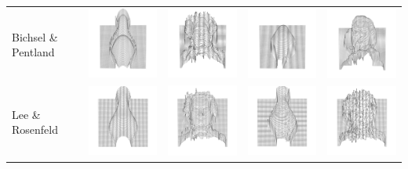 \documentclass{beamer}
\begin{document}
\begin{frame}
\begin{tabular}{lcccc}
		Bichsel \& Pentland &
		\includegraphics[width=0.15\linewidth]{includes/vergleich/bichsel_pentland/bichsel_pentland_vase_001} & \includegraphics[width=0.15\linewidth]{includes/vergleich/bichsel_pentland/bichsel_pentland_mozart_001} &
		\includegraphics[width=0.15\linewidth]{includes/vergleich/bichsel_pentland/bichsel_pentland_vase_101} & \includegraphics[width=0.15\linewidth]{includes/vergleich/bichsel_pentland/bichsel_pentland_mozart_101} \\
		Lee \& Rosenfeld &
		\includegraphics[width=0.15\linewidth]{includes/vergleich/lee_rosenfeld/lee_rosenfeld_vase_001} & \includegraphics[width=0.15\linewidth]{includes/vergleich/lee_rosenfeld/lee_rosenfeld_mozart_001} &
		\includegraphics[width=0.15\linewidth]{includes/vergleich/lee_rosenfeld/lee_rosenfeld_vase_101} & \includegraphics[width=0.15\linewidth]{includes/vergleich/lee_rosenfeld/lee_rosenfeld_mozart_101}
	\end{tabular}
\end{frame}
\end{document}
